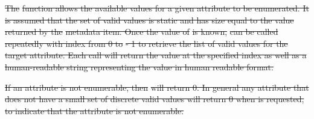 \documentclass[12pt]{report} %
\providecommand{\DIFdeltex}[1]{{\protect\color{red}\sout{#1}}}                      %
\providecommand{\DIFdelbegin}{} %
\providecommand{\DIFdelend}{} %
\providecommand{\DIFdel}[1]{\texorpdfstring{\DIFdeltex{#1}}{}} %
\newcommand{\DIFscaledelfig}{0.5}
\newlength{\DIFdelgraphicswidth} %
\newlength{\DIFdelgraphicsheight} %
\newcommand{\DIFdelincludegraphics}[2][]{%
\sbox{\DIFdelgraphicsbox}{\DIFOincludegraphics[#1]{#2}}%
\settoboxwidth{\DIFdelgraphicswidth}{\DIFdelgraphicsbox} %
\settoboxtotalheight{\DIFdelgraphicsheight}{\DIFdelgraphicsbox} %
\scalebox{\DIFscaledelfig}{%
\parbox[b]{\DIFdelgraphicswidth}{\usebox{\DIFdelgraphicsbox}\\[-\baselineskip] \rule{\DIFdelgraphicswidth}{0em}}\llap{\resizebox{\DIFdelgraphicswidth}{\DIFdelgraphicsheight}{%
\setlength{\unitlength}{\DIFdelgraphicswidth}%
\begin{picture}(1,1)%
\thicklines\linethickness{2pt} %
{\color[rgb]{1,0,0}\put(0,0){\framebox(1,1){}}}%
{\color[rgb]{1,0,0}\put(0,0){\line( 1,1){1}}}%
{\color[rgb]{1,0,0}\put(0,1){\line(1,-1){1}}}%
\end{picture}%
}\hspace*{3pt}}} %
} %
\DeclareRobustCommand{\DIFdelbegin}{\DIFOdelbegin \let\includegraphics\DIFdelincludegraphics} %
\DeclareRobustCommand{\DIFdelend}{\DIFOaddend \let\includegraphics\DIFOincludegraphics} %
\begin{document}
\DIFdelend %
\DIFdelbegin %
\DIFdel{The }%
\DIFdel{function allows the available values for a given
attribute to be enumerated.  It is assumed that the set of valid values is static
and has size equal to the value returned by the }%
\DIFdel{metadata item.
Once the value of }%
\DIFdel{is known, }%
\DIFdel{can
be called repeatedly with index from 0 to }%
\DIFdel{- 1 to retrieve the
list of valid values for the target attribute.  Each call will return the
value at the specified index as well as a human-readable string representing the
value in human readable format.
}%

\DIFdel{If an attribute is not enumerable, then }%
\DIFdel{will return 0.  In
general any attribute that does not have a small set of discrete valid
values will return 0 when \textt{PWR_MD_NUM} is requested, to indicate that the
attribute is not enumerable.
}%
\end{document}
